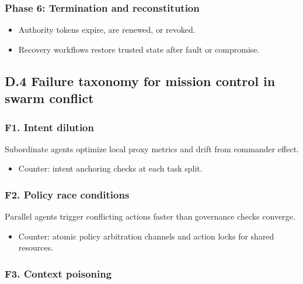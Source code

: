 \documentclass[
]{article}
\providecommand{\tightlist}{%
  \setlength{\itemsep}{0pt}\setlength{\parskip}{0pt}}
\begin{document}
\hypertarget{phase-6-termination-and-reconstitution}{%
\subsubsection{Phase 6: Termination and
reconstitution}\label{phase-6-termination-and-reconstitution}}

\begin{itemize}
\tightlist
\item
  Authority tokens expire, are renewed, or revoked.
\item
  Recovery workflows restore trusted state after fault or compromise.
\end{itemize}

\hypertarget{d.4-failure-taxonomy-for-mission-control-in-swarm-conflict}{%
\subsection{D.4 Failure taxonomy for mission control in swarm
conflict}\label{d.4-failure-taxonomy-for-mission-control-in-swarm-conflict}}

\hypertarget{f1.-intent-dilution}{%
\subsubsection{F1. Intent dilution}\label{f1.-intent-dilution}}

Subordinate agents optimize local proxy metrics and drift from commander
effect.

\begin{itemize}
\tightlist
\item
  Counter: intent anchoring checks at each task split.
\end{itemize}

\hypertarget{f2.-policy-race-conditions}{%
\subsubsection{F2. Policy race
conditions}\label{f2.-policy-race-conditions}}

Parallel agents trigger conflicting actions faster than governance
checks converge.

\begin{itemize}
\tightlist
\item
  Counter: atomic policy arbitration channels and action locks for
  shared resources.
\end{itemize}

\hypertarget{f3.-context-poisoning}{%
\subsubsection{F3. Context poisoning}\label{f3.-context-poisoning}}
\end{document}
